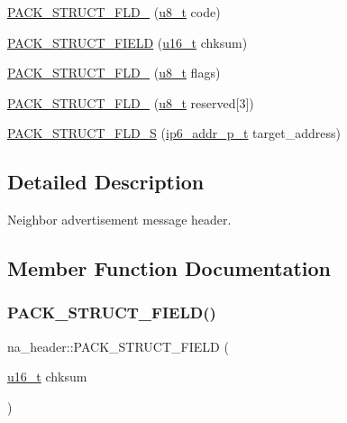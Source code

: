 \begin{DoxyCompactItemize}
\hyperlink{structna__header_a15c81650ca42d8a731f841d642ee2bc0}{P\+A\+C\+K\+\_\+\+S\+T\+R\+U\+C\+T\+\_\+\+F\+L\+D\+\_} (\hyperlink{group__compiler__abstraction_ga4caecabca98b43919dd11be1c0d4cd8e}{u8\+\_\+t} code)
\item 
\hyperlink{structna__header_a3c32b9182b91d8d0962259ef43fe6f2f}{P\+A\+C\+K\+\_\+\+S\+T\+R\+U\+C\+T\+\_\+\+F\+I\+E\+LD} (\hyperlink{group__compiler__abstraction_ga77570ac4fcab86864fa1916e55676da2}{u16\+\_\+t} chksum)
\item 
\hyperlink{structna__header_a256bbbeb3f2818f2cddf77c9978600ee}{P\+A\+C\+K\+\_\+\+S\+T\+R\+U\+C\+T\+\_\+\+F\+L\+D\+\_} (\hyperlink{group__compiler__abstraction_ga4caecabca98b43919dd11be1c0d4cd8e}{u8\+\_\+t} flags)
\item 
\hyperlink{structna__header_aeafa2cf21dabf0a59da2640db4a9aacb}{P\+A\+C\+K\+\_\+\+S\+T\+R\+U\+C\+T\+\_\+\+F\+L\+D\+\_} (\hyperlink{group__compiler__abstraction_ga4caecabca98b43919dd11be1c0d4cd8e}{u8\+\_\+t} reserved\mbox{[}3\mbox{]})
\item 
\hyperlink{structna__header_ac6055f058c928dca86a74d6035d175cb}{P\+A\+C\+K\+\_\+\+S\+T\+R\+U\+C\+T\+\_\+\+F\+L\+D\+\_\+S} (\hyperlink{native_2lwip_2src_2include_2lwip_2prot_2ip6_8h_a560932a657f17ec5a0a3a78a1ce7e60a}{ip6\+\_\+addr\+\_\+p\+\_\+t} target\+\_\+address)
\end{DoxyCompactItemize}


\subsection{Detailed Description}
Neighbor advertisement message header. 

\subsection{Member Function Documentation}
\mbox{\label{structna__header_a3c32b9182b91d8d0962259ef43fe6f2f}} 
\subsubsection{\texorpdfstring{P\+A\+C\+K\+\_\+\+S\+T\+R\+U\+C\+T\+\_\+\+F\+I\+E\+L\+D()}{PACK\_STRUCT\_FIELD()}\hspace{0.1cm}{\footnotesize\ttfamily [1/2]}}
{\footnotesize\ttfamily na\+\_\+header\+::\+P\+A\+C\+K\+\_\+\+S\+T\+R\+U\+C\+T\+\_\+\+F\+I\+E\+LD (\begin{DoxyParamCaption}\item[{\hyperlink{group__compiler__abstraction_ga77570ac4fcab86864fa1916e55676da2}{u16\+\_\+t}}]{chksum }\end{DoxyParamCaption})}

